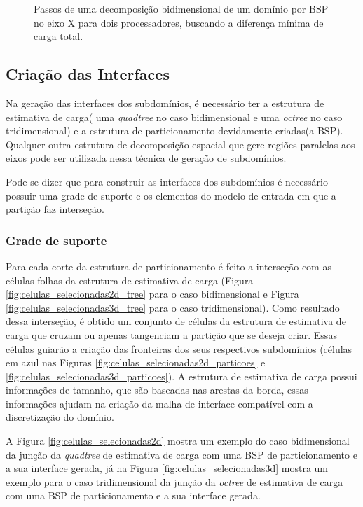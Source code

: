 \begin{figure}[ht]
{	}
	\caption{Passos de uma decomposição bidimensional de um domínio por BSP no eixo X para dois processadores, buscando a diferença mínima de carga total.}
	\label{fig:passos_decomposicao_BSP}
\end{figure}


\subsection{Criação das Interfaces}

Na geração das interfaces dos subdomínios, é necessário ter a estrutura de estimativa de carga( uma \textit{quadtree} no caso bidimensional e uma \textit{octree} no caso tridimensional) e a estrutura de particionamento devidamente criadas(a BSP). Qualquer outra estrutura de decomposição espacial que gere regiões paralelas aos eixos pode ser utilizada nessa técnica de geração de subdomínios. 

Pode-se dizer que para construir as interfaces dos subdomínios é necessário possuir uma grade de suporte e os elementos do modelo de entrada em que a partição faz interseção.

\subsubsection{Grade de suporte}

Para cada corte da estrutura de particionamento é feito a interseção com as células folhas da estrutura de estimativa de carga (Figura \ref{fig:celulas_selecionadas2d_tree} para o caso bidimensional e Figura \ref{fig:celulas_selecionadas3d_tree} para o caso tridimensional). Como resultado dessa interseção, é obtido um conjunto de células da estrutura de estimativa de carga que cruzam ou apenas tangenciam a partição que se deseja criar. Essas células guiarão a criação das fronteiras dos seus respectivos subdomínios (células em azul nas Figuras \ref{fig:celulas_selecionadas2d_particoes} e \ref{fig:celulas_selecionadas3d_particoes}). A estrutura de estimativa de carga possui informações de tamanho, que são baseadas nas arestas da borda, essas informações ajudam na criação da malha de interface compatível com a discretização do domínio.

A Figura \ref{fig:celulas_selecionadas2d} mostra um exemplo do caso bidimensional da junção da \textit{quadtree} de estimativa de carga com uma BSP de particionamento e a sua interface gerada, já na Figura \ref{fig:celulas_selecionadas3d} mostra um exemplo para o caso tridimensional da junção da \textit{octree} de estimativa de carga com uma BSP de particionamento e a sua interface gerada.

